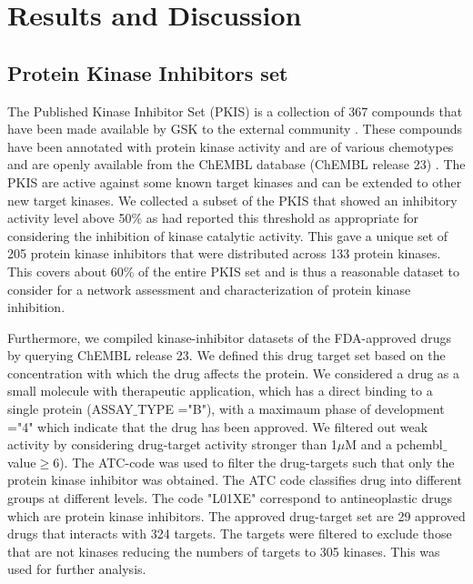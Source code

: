 \documentclass[a4paper, 11pt]{article}
\begin{document}
\section*{Results and Discussion}
\subsection*{Protein Kinase Inhibitors set}
The Published Kinase Inhibitor Set (PKIS) is a collection of 367 compounds that have been made available by GSK to the external community \cite{dranchak2013profile, knapp2013public}. These compounds have been annotated with protein kinase  activity \cite{knapp2013public} and are of various chemotypes and are openly available from the ChEMBL database (ChEMBL release 23) \cite{gaulton2016chembl}. The PKIS are active against some known target kinases and can be extended to other new target kinases. We collected a subset of the PKIS that showed an inhibitory activity level above 50\% as \cite{dranchak2013profile,  anastassiadis2011comprehensive} had reported this threshold as appropriate for considering the inhibition of kinase catalytic activity. This gave a unique set of 205 protein kinase inhibitors that were distributed across 133 protein kinases. This covers about 60\% of the entire PKIS set and is thus a reasonable dataset to consider for a network assessment and characterization of protein kinase inhibition.\par
Furthermore, we compiled kinase-inhibitor datasets of the FDA-approved drugs by querying ChEMBL release 23. We defined this drug target set based on the concentration with which the drug affects the protein. We considered a drug as a small molecule with therapeutic application, which has a direct binding to a single protein (ASSAY$\_$TYPE ="B"), with a maximaum phase of development ="4" which indicate that the drug has been approved. We filtered out weak activity by considering drug-target activity stronger than 1$\mu$M and a pchembl$\_$value$\geq$6). The ATC-code was used to filter the drug-targets such that only the protein kinase inhibitor was obtained. The ATC code classifies drug into different groups at different levels. The code "L01XE" correspond to antineoplastic drugs which are protein kinase inhibitors. The approved drug-target set are 29 approved drugs that interacts with 324 targets. The targets were filtered to exclude those that are not kinases reducing the numbers of targets to 305 kinases. This was used for further analysis.
\end{document}
